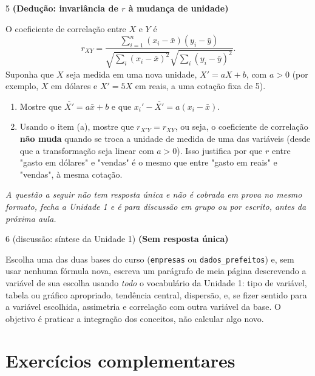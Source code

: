 \documentclass[11pt]{article}
\begin{document}
\begin{questao}{5} \textbf{(Dedução: invariância de $r$ à mudança de unidade)}

O coeficiente de correlação entre $X$ e $Y$ é
$$
r_{XY} = \frac{\sum_{i=1}^n (x_i-\bar x)(y_i-\bar y)}{\sqrt{\sum_i (x_i-\bar x)^2}\sqrt{\sum_i (y_i-\bar y)^2}}.
$$
Suponha que $X$ seja medida em uma nova unidade, $X' = aX + b$, com $a>0$ (por exemplo,
$X$ em dólares e $X'=5X$ em reais, a uma cotação fixa de 5).

\begin{enumerate}[label=(\alph*)]
  \item Mostre que $\overline{X'} = a\bar x + b$ e que $x_i' - \overline{X'} = a(x_i - \bar x)$.
  \item Usando o item (a), mostre que $r_{X'Y} = r_{XY}$, ou seja, o coeficiente de correlação
    \textbf{não muda} quando se troca a unidade de medida de uma das variáveis (desde que a
    transformação seja linear com $a>0$). Isso justifica por que $r$ entre "gasto em dólares" e
    "vendas" é o mesmo que entre "gasto em reais" e "vendas", à mesma cotação.
\end{enumerate}
\end{questao}

\bigskip
\noindent\textit{A questão a seguir não tem resposta única e não é cobrada em prova no mesmo
formato, fecha a Unidade 1 e é para discussão em grupo ou por escrito, antes da próxima aula.}

\begin{questao}{6 (discussão: síntese da Unidade 1)} \textbf{(Sem resposta única)}

Escolha uma das duas bases do curso (\texttt{empresas} ou \texttt{dados\_prefeitos}) e, sem usar
nenhuma fórmula nova, escreva um parágrafo de meia página descrevendo a variável de sua escolha
usando \emph{todo} o vocabulário da Unidade 1: tipo de variável, tabela ou gráfico apropriado,
tendência central, dispersão, e, se fizer sentido para a variável escolhida, assimetria e
correlação com outra variável da base. O objetivo é praticar a integração dos conceitos, não
calcular algo novo.
\end{questao}


\bigskip
\section*{Exercícios complementares}
\end{document}
